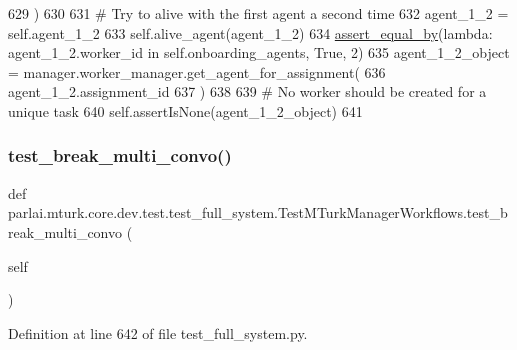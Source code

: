 \begin{DoxyCode}
629         )
630 
631         \textcolor{comment}{# Try to alive with the first agent a second time}
632         agent\_1\_2 = self.agent\_1\_2
633         self.alive\_agent(agent\_1\_2)
634         \hyperlink{namespaceparlai_1_1mturk_1_1core_1_1test_1_1test__full__system_a0b463246d35658a2e422010f13dcf819}{assert\_equal\_by}(\textcolor{keyword}{lambda}: agent\_1\_2.worker\_id \textcolor{keywordflow}{in} self.onboarding\_agents, \textcolor{keyword}{True}, 2)
635         agent\_1\_2\_object = manager.worker\_manager.get\_agent\_for\_assignment(
636             agent\_1\_2.assignment\_id
637         )
638 
639         \textcolor{comment}{# No worker should be created for a unique task}
640         self.assertIsNone(agent\_1\_2\_object)
641 
\end{DoxyCode}
\mbox{\label{classparlai_1_1mturk_1_1core_1_1dev_1_1test_1_1test__full__system_1_1TestMTurkManagerWorkflows_a78cac9cd90bba3563697fa94ae202d85}} 
\subsubsection{\texorpdfstring{test\+\_\+break\+\_\+multi\+\_\+convo()}{test\_break\_multi\_convo()}}
{\footnotesize\ttfamily def parlai.\+mturk.\+core.\+dev.\+test.\+test\+\_\+full\+\_\+system.\+Test\+M\+Turk\+Manager\+Workflows.\+test\+\_\+break\+\_\+multi\+\_\+convo (\begin{DoxyParamCaption}\item[{}]{self }\end{DoxyParamCaption})}



Definition at line 642 of file test\+\_\+full\+\_\+system.\+py.


